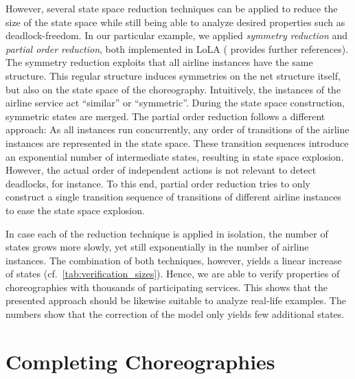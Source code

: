 However, several state space reduction techniques can be applied to reduce the size of the state space while still being able to analyze desired properties such as deadlock-freedom. In our particular example, we applied \emph{symmetry reduction} and \emph{partial order reduction}, both implemented in LoLA (\citet{Wolf_2007_icatpn} provides further references). The symmetry reduction exploits  that all airline instances have the same structure. This regular structure induces symmetries on the net structure itself, but also on the state space of the choreography. Intuitively, the instances of the airline service act ``similar'' or ``symmetric''. During the state space construction, symmetric states are merged. The partial order reduction follows a different approach: As all instances run concurrently, any order of transitions of the airline instances are represented in the state space. These transition sequences introduce an exponential number of intermediate states, resulting in state space explosion. However, the actual order of independent actions is not relevant to detect deadlocks, for instance. To this end, partial order reduction tries to only construct a single transition sequence of transitions of different airline instances to ease the state space explosion.

\enlargethispage*{\baselineskip}

In case each of the reduction technique is applied in isolation, the number of states grows more slowly, yet still exponentially in the number of airline instances. The combination of both techniques, however, yields a linear increase of states (cf.~\autoref{tab:verification_sizes}). Hence, we are able to verify properties of  choreographies with thousands of participating services. This shows that the presented approach should be likewise suitable to analyze real-life examples. The numbers show that the correction of the model only yields few additional states.





\section{Completing Choreographies}\label{sec:ver:syn}

